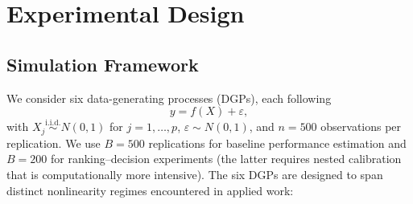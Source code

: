 \documentclass[a4paper,11pt]{article}
\begin{document}
\section{Experimental Design}
\label{sec:design}

\subsection{Simulation Framework}

We consider six data-generating processes (DGPs), each following
\begin{equation}
    y = f(X) + \varepsilon,
\end{equation}
with $X_j \stackrel{\text{i.i.d.}}{\sim} N(0,1)$ for $j=1,\ldots,p$, $\varepsilon \sim N(0,1)$, and $n = 500$ observations per replication. We use $B = 500$ replications for baseline performance estimation and $B = 200$ for ranking--decision experiments (the latter requires nested calibration that is computationally more intensive). The six DGPs are designed to span distinct nonlinearity regimes encountered in applied work:
\end{document}
